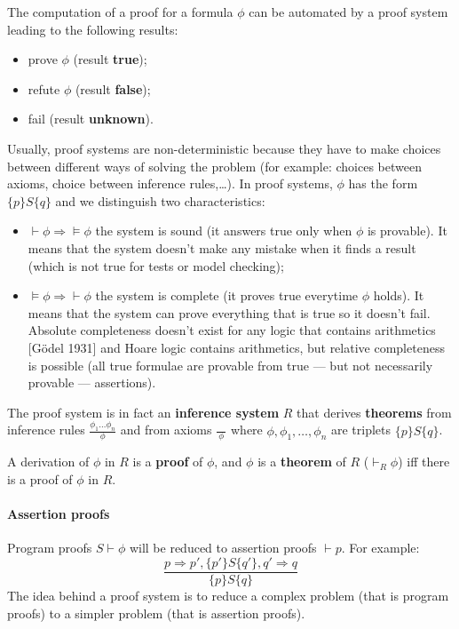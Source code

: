 \documentclass[12pt, a4paper]{book}
\begin{document}
The computation of a proof for a formula $\phi$ can be automated by a proof
system leading to the following results:

\begin{itemize}
    \item prove $\phi$ (result \textbf{true});
    \item refute $\phi$ (result \textbf{false});
    \item fail (result \textbf{unknown}).
\end{itemize}

Usually, proof systems are non-deterministic because they have to make choices
between different ways of solving the problem (for example: choices between
axioms, choice between inference rules,\ldots). In proof systems, $\phi$ has the
form $\{p\} S\{q\}$ and we distinguish two characteristics:
\begin{itemize}
    \item $\vdash \phi \Rightarrow \vDash \phi$ the system is sound (it answers
    true only when $\phi$ is provable). It means that the system doesn't make
    any mistake when it finds a result (which is not true for tests or model
    checking);
    \item $\vDash \phi \Rightarrow \vdash \phi$ the system is complete (it
    proves true everytime $\phi$ holds). It means that the system can prove
    everything that is true so it doesn't fail. Absolute completeness doesn't
    exist for any logic that contains arithmetics [Gödel 1931] and Hoare logic
    contains arithmetics, but relative completeness is possible (all true
    formulae are provable from true --- but not necessarily provable ---
    assertions).
\end{itemize}

The proof system is in fact an \textbf{inference system} $R$ that derives
\textbf{theorems} from inference rules $\frac{\phi_1\ldots\phi_n}{\phi}$ and
from axioms $\frac{}{\ \phi\ }$ where $\phi,\phi_1,\ldots,\phi_n$ are triplets
$\{p\}S\{q\}$. \newline

A derivation of $\phi$ in $R$ is a \textbf{proof} of $\phi$, and $\phi$ is a
\textbf{theorem} of $R$ (${\vdash}_{R}\phi$) iff there is a proof of $\phi$
in $R$.

\paragraph{Assertion proofs} Program proofs $S\vdash \phi$ will be reduced to
assertion proofs $\vdash p$. For example:
$$
\frac
{p\Rightarrow p', \{p'\}S\{q'\}, q'\Rightarrow q}
{\{p\}S\{q\}}
$$
The idea behind a proof system is to reduce a complex problem (that is program
proofs) to a simpler problem (that is assertion proofs).
\end{document}
